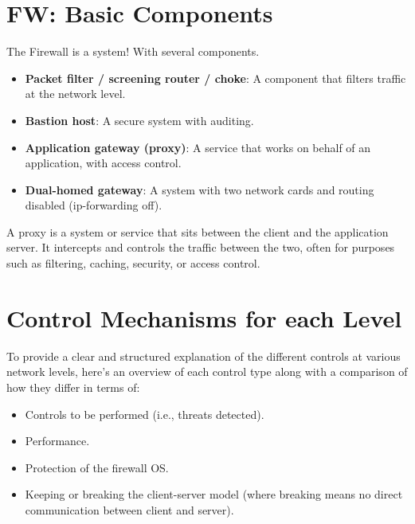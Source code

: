 \section*{FW: Basic Components}
\begin{tcolorbox}[colback=red!10!white, colframe=red!70!black, coltitle=white, title=Beware]
The Firewall is a system! With several components.
\end{tcolorbox}

\begin{itemize}
    \item \textbf{Packet filter / screening router / choke}: A component that filters traffic at the network level.
    \item \textbf{Bastion host}: A secure system with auditing.
    \item \textbf{Application gateway (proxy)}: A service that works on behalf of an application, with access control.
    \item \textbf{Dual-homed gateway}: A system with two network cards and routing disabled (ip-forwarding off).
\end{itemize}

\begin{tcolorbox}[colback=blue!10!white, colframe=blue!50!white, title=What is a Proxy]
    A proxy is a system or service that sits between the client and the application server. It intercepts and controls the traffic between the two, often for purposes such as filtering, caching, security, or access control.
\end{tcolorbox}

\section{Control Mechanisms for each Level}
To provide a clear and structured explanation of the different controls at various network levels, here’s an overview of each control type along with a comparison of how they differ in terms of:
\begin{itemize}
    \item Controls to be performed (i.e., threats detected).
    \item Performance.
    \item Protection of the firewall OS.
    \item Keeping or breaking the client-server model (where breaking means no direct communication between client and server).
\end{itemize}

